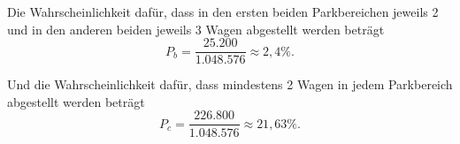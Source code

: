 \documentclass[main.tex]{subfiles}
\begin{document}
Die Wahrscheinlichkeit dafür, dass in den ersten beiden Parkbereichen jeweils 2 und in den anderen beiden jeweils 3 Wagen abgestellt werden beträgt $$
    P_b = \frac{25.200}{1.048.576} \approx 2,4\%.
$$

Und die Wahrscheinlichkeit dafür, dass mindestens 2 Wagen in jedem Parkbereich abgestellt werden beträgt $$
    P_c = \frac{226.800}{1.048.576} \approx 21,63\%.
$$

%
\end{document}
